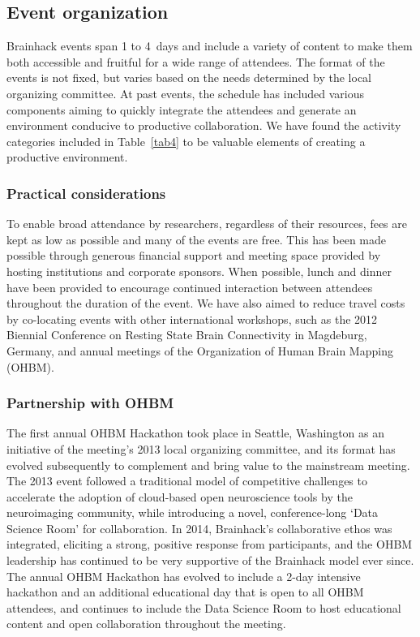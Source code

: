 \documentclass[11pt]{bmc_article_s50}
\begin{document}
\subsection*{Event organization}

Brainhack events span %
1 to %
4~days and include %
 a variety of content to make them both accessible and fruitful for a wide range of attendees. The format of the events is not fixed, but varies based on the needs determined by the local organizing committee. At past events, the schedule has included various components aiming to quickly integrate the attendees and generate an environment conducive to productive collaboration. We have found the activity categories included in Table~\ref{tab4} to be valuable elements of creating a productive environment. 

\subsubsection*{Practical considerations}

To enable broad attendance by researchers, regardless of their resources, fees are kept as low as possible and many of the events are free. This has been made possible through generous financial support and meeting space provided by hosting institutions and corporate sponsors. When possible, lunch and dinner have been provided to encourage continued interaction between attendees throughout the duration of the event. We have also aimed to reduce travel costs by co-locating events with other international workshops, such as the 2012 Biennial Conference on Resting State Brain Connectivity in Magdeburg, Germany, and annual meetings of the Organization of Human Brain Mapping (OHBM). 

\subsubsection*{Partnership with OHBM}

The first annual OHBM Hackathon took place in Seattle, Washington as an initiative of the meeting's 2013 local organizing committee, and its format has evolved subsequently to complement and bring value to the mainstream meeting. The 2013 event followed a traditional model of competitive challenges to accelerate the adoption of cloud-based open neuroscience tools by the neuroimaging community, while introducing a novel, conference-long `Data Science Room' for collaboration. In 2014, Brainhack's collaborative ethos was integrated, eliciting a strong, positive response from participants, and the OHBM leadership has continued to be very supportive of the Brainhack model ever since. The annual OHBM Hackathon has evolved to include a %
2-day intensive hackathon %
and an additional educational day that is open to all OHBM attendees, and continues to include the Data Science Room to host educational content and open collaboration throughout the meeting. 
\end{document}
